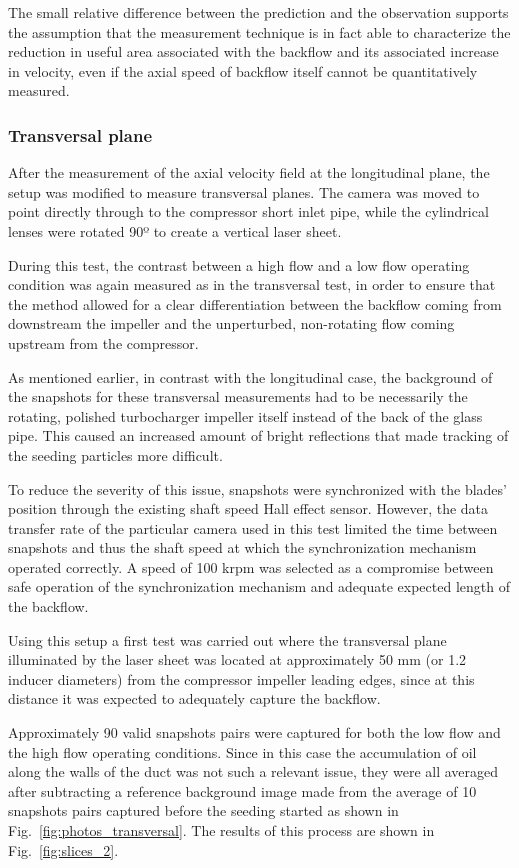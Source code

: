 The small relative difference between the prediction and the observation supports the assumption that the measurement technique is in fact able to characterize the reduction in useful area associated with the backflow and its associated increase in velocity, even if the axial speed of backflow itself cannot be quantitatively measured.

\subsubsection{Transversal plane}

After the measurement of the axial velocity field at the longitudinal plane, the setup was modified to measure transversal planes. The camera was moved to point directly through to the compressor short inlet pipe, while the cylindrical lenses were rotated 90º to create a vertical laser sheet.

During this test, the contrast between a high flow and a low flow operating condition was again measured as in the transversal test, in order to ensure that the method allowed for a clear differentiation between the backflow coming from downstream the impeller and the unperturbed, non-rotating flow coming upstream from the compressor.

As mentioned earlier, in contrast with the longitudinal case, the background of the snapshots for these transversal measurements had to be necessarily the rotating, polished turbocharger impeller itself instead of the back of the glass pipe. This caused an increased amount of bright reflections that made tracking of the seeding particles more difficult.

To reduce the severity of this issue, snapshots were synchronized with the blades' position through the existing shaft speed Hall effect sensor. However, the data transfer rate of the particular camera used in this test limited the time between snapshots and thus the shaft speed at which the synchronization mechanism operated correctly. A speed of 100 krpm was selected as a compromise between safe operation of the synchronization mechanism and adequate expected length of the backflow.

Using this setup a first test was carried out where the transversal plane illuminated by the laser sheet was located at approximately 50 mm (or 1.2 inducer diameters) from the compressor impeller leading edges, since at this distance it was expected to adequately capture the backflow.

Approximately 90 valid snapshots pairs were captured for both the low flow and the high flow operating conditions. Since in this case the accumulation of oil along the walls of the duct was not such a relevant issue, they were all averaged after subtracting a reference background image made from the average of 10 snapshots pairs captured before the seeding started as shown in Fig.~\ref{fig:photos_transversal}. The results of this process are shown in Fig.~\ref{fig:slices_2}.

